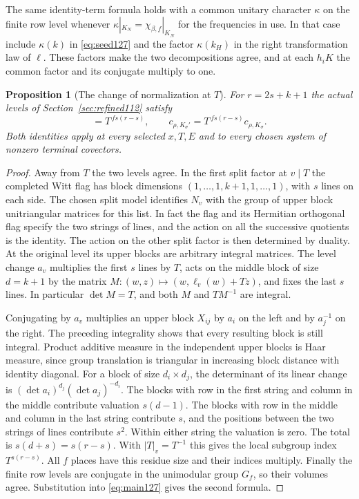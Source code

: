 \documentclass[a4paper,11pt]{article}
\newtheorem{proposition}{Proposition}[section]
\theoremstyle{definition}
\theoremstyle{remark}
\numberwithin{equation}{section}
\begin{document}
The same identity-term formula holds with a common unitary
character \(\kappa\) on the finite row level whenever
\(\kappa|_{K_N}=\chi_{\beta,f}|_{K_N}\) for the frequencies in
use. In that case include \(\kappa(k)\) in \eqref{eq:seed127} and
the factor \(\kappa(k_H)\) in the right transformation law of
\(\ell\). These factors make the two decompositions agree, and at
each \(h_iK\) the common factor and its conjugate multiply to one.

\begin{proposition}[The change of normalization at \(T\)]
\label{prop:vol127}
For \(r=2s+k+1\) the actual levels of Section~\ref{sec:refined112}
satisfy
\begin{equation}
 [N_f\cap K_\sigma:N_f\cap K_\sigma']=T^{\,fs(r-s)},\qquad
          c_{\rho,K_\sigma'}=T^{\,fs(r-s)}c_{\rho,K_\sigma}.
 \label{eq:unipindex127}
\end{equation}
Both identities apply at every selected \(x,T,E\) and to every
chosen system of nonzero terminal covectors.
\end{proposition}
\begin{proof}
Away from \(T\) the two levels agree. In the first split factor at
\(v\mid T\) the completed Witt flag has block dimensions
\((1,\ldots,1,k+1,1,\ldots,1)\), with \(s\) lines on each side.
The chosen split model identifies \(N_v\) with the group of upper
block unitriangular matrices for this list. In fact the flag and
its Hermitian orthogonal flag specify the two strings of lines,
and the action on all the successive quotients is the identity.
The action on the other split factor is then determined by duality.
At the original level its upper blocks are arbitrary integral
matrices. The level change \(a_v\) multiplies the first \(s\)
lines by \(T\), acts on the middle block of size \(d=k+1\)
by the matrix \(M:(w,z)\mapsto(w,\ell_v(w)+Tz)\), and fixes the
last \(s\) lines. In particular \(\det M=T\), and both \(M\)
and \(TM^{-1}\) are integral.

Conjugating by \(a_v\) multiplies an upper block \(X_{ij}\) by
\(a_i\) on the left and by \(a_j^{-1}\) on the right. The
preceding integrality shows that every resulting block is still
integral. Product additive measure in the independent upper
blocks is Haar measure, since group translation is triangular
in increasing block distance with identity diagonal. For a block
of size \(d_i\times d_j\), the determinant of its linear change
is \((\det a_i)^{d_j}(\det a_j)^{-d_i}\). The blocks with row in
the first string and column in the middle contribute valuation
\(s(d-1)\). The blocks with row in the middle and column in the
last string contribute \(s\), and the positions between the two
strings of lines contribute \(s^2\). Within either string the
valuation is zero. The total is \(s(d+s)=s(r-s)\). With
\(\lvert T\rvert_v=T^{-1}\) this gives the local subgroup index
\(T^{s(r-s)}\). All \(f\) places have this residue size and their
indices multiply. Finally the finite row levels are conjugate in
the unimodular group \(G_f\), so their volumes agree. Substitution
into \eqref{eq:main127} gives the second formula.
\end{proof}
\end{document}
